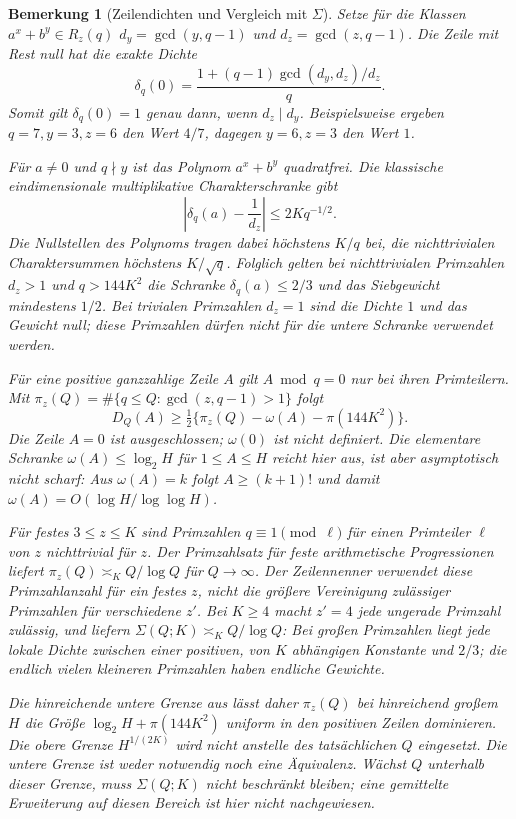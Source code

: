 \documentclass[11pt,a4paper]{article}
\newtheorem{remark}[theorem]{Bemerkung}
\begin{document}
\begin{remark}[Zeilendichten und Vergleich mit $\Sigma$]
\label{rem:Sigma-comparison}
Setze für die Klassen $a^x+b^y\in R_z(q)$
$d_y=\gcd(y,q-1)$ und $d_z=\gcd(z,q-1)$.
Die Zeile mit Rest null hat die exakte Dichte
\[
 \delta_q(0)=
 \frac{1+(q-1)\gcd(d_y,d_z)/d_z}{q}.
\]
Somit gilt $\delta_q(0)=1$ genau dann, wenn $d_z\mid d_y$.
Beispielsweise ergeben $q=7,y=3,z=6$ den Wert $4/7$,
dagegen $y=6,z=3$ den Wert $1$.

Für $a\ne0$ und $q\nmid y$ ist das Polynom $a^x+b^y$ quadratfrei.
Die klassische eindimensionale multiplikative Charakterschranke gibt
\[
 \left|\delta_q(a)-\frac1{d_z}\right|\le2Kq^{-1/2}.
\]
Die Nullstellen des Polynoms tragen dabei höchstens $K/q$ bei,
die nichttrivialen Charaktersummen höchstens $K/\sqrt q$.
Folglich gelten bei \emph{nichttrivialen} Primzahlen $d_z>1$ und
$q>144K^2$ die Schranke $\delta_q(a)\le2/3$ und das Siebgewicht
mindestens $1/2$. Bei trivialen Primzahlen $d_z=1$ sind die Dichte
$1$ und das Gewicht null; diese Primzahlen dürfen nicht für die
untere Schranke verwendet werden.

Für eine positive ganzzahlige Zeile $A$ gilt $A\bmod q=0$ nur
bei ihren Primteilern. Mit
$\pi_z(Q)=\#\{q\le Q:\gcd(z,q-1)>1\}$ folgt
\[
 D_Q(A)\ge
 \tfrac12\{\pi_z(Q)-\omega(A)-\pi(144K^2)\}.
\]
Die Zeile $A=0$ ist ausgeschlossen; $\omega(0)$ ist nicht definiert.
Die elementare Schranke $\omega(A)\le\log_2 H$ für $1\le A\le H$
reicht hier aus, ist aber asymptotisch nicht scharf:
Aus $\omega(A)=k$ folgt $A\ge(k+1)!$ und damit
$\omega(A)=O(\log H/\log\log H)$.

Für festes $3\le z\le K$ sind Primzahlen $q\equiv1\pmod{\ell}$
für einen Primteiler $\ell$ von $z$ nichttrivial für $z$.
Der Primzahlsatz für feste arithmetische Progressionen~\cite[Satz~4.12]{KedlayaANT} liefert
$\pi_z(Q)\asymp_K Q/\log Q$ für $Q\to\infty$.
Der Zeilennenner verwendet diese Primzahlanzahl für ein
\emph{festes $z$}, nicht die größere Vereinigung zulässiger
Primzahlen für verschiedene $z'$.
Bei $K\ge4$ macht $z'=4$ jede ungerade Primzahl zulässig, und
 liefern
$\Sigma(Q;K)\asymp_K Q/\log Q$: Bei großen Primzahlen liegt jede
lokale Dichte zwischen einer positiven, von $K$ abhängigen Konstante
und $2/3$; die endlich vielen kleineren Primzahlen haben endliche
Gewichte.

Die hinreichende untere Grenze aus  lässt daher
$\pi_z(Q)$ bei hinreichend großem $H$ die Größe
$\log_2 H+\pi(144K^2)$ uniform in den positiven Zeilen dominieren.
Die obere Grenze $H^{1/(2K)}$ wird nicht anstelle des tatsächlichen
$Q$ eingesetzt. Die untere Grenze ist weder notwendig noch eine
Äquivalenz. Wächst $Q$ unterhalb dieser Grenze, muss $\Sigma(Q;K)$
nicht beschränkt bleiben; eine gemittelte Erweiterung auf diesen
Bereich ist hier nicht nachgewiesen.
\end{remark}
\end{document}

